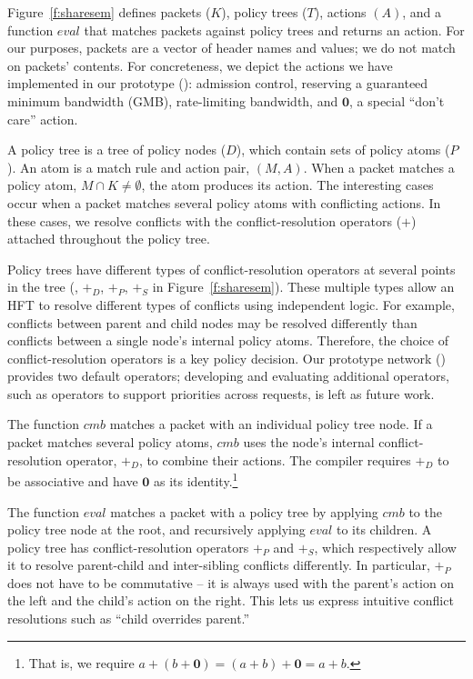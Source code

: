 Figure~\ref{f:sharesem} defines packets ($K$), policy trees ($T$),
actions $(A)$, and a function $\mathit{eval}$ that matches packets
against policy trees and returns an action.  
For our purposes, packets are 
a vector of header names and values; we do not match on packets'
contents. For concreteness, we depict the actions we have implemented in 
our prototype (): admission control, reserving a guaranteed
minimum bandwidth (GMB), rate-limiting bandwidth, and $\textbf{0}$, a special ``don't care''
action.

A policy tree is a tree of policy nodes ($D$), which contain sets of policy
atoms ($P$). An atom is a match rule and action pair, $(M,A)$. When a
packet matches a policy atom, $M \cap K \ne \emptyset$, the atom produces
its action. The interesting cases occur when a packet matches several
policy atoms with conflicting actions. In these cases, we resolve conflicts
with the conflict-resolution operators ($+$) attached throughout the policy tree.

Policy trees have different types of conflict-resolution operators at several
points in the tree (\ie, $+_D$, $+_P$, $+_S$ in Figure~\ref{f:sharesem}). 
These multiple types allow an HFT to resolve different types of conflicts using
independent logic. For example, conflicts between parent and child nodes
may be resolved differently than conflicts between a single node's internal
policy atoms.
Therefore, the choice of conflict-resolution operators is a key policy decision.
Our prototype network () provides two default operators;
developing and evaluating additional operators, such as operators to
support priorities across requests, is left as future work.

The function $\mathit{cmb}$ matches a packet with an individual policy
tree node. If a packet matches several policy atoms,
$\mathit{cmb}$ uses the node's internal conflict-resolution operator, $+_D$,
to combine their actions. The compiler
requires $+_D$ to be associative and have $\textbf{0}$
as its identity.\footnote{That is, we require $a + (b + \textbf{0}) =
  (a + b) + \textbf{0} = a + b$.}

The function $\mathit{eval}$ matches a packet with a policy tree by
applying $\mathit{cmb}$ to the policy tree node at the root, and
recursively applying $\mathit{eval}$ to its children. A policy tree
has conflict-resolution operators $+_P$ and $+_S$, which respectively allow
it to resolve parent-child and inter-sibling conflicts differently. In
particular, $+_P$ does not have to be commutative -- it is always used
with the parent's action on the left and the child's action on the
right. This lets us express intuitive conflict resolutions such as ``child overrides
parent.''



